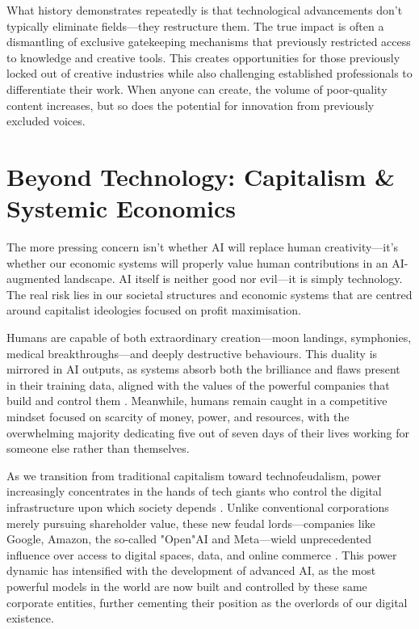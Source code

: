 \documentclass[12pt]{article}
\begin{document}
What history demonstrates repeatedly is that technological advancements don't typically eliminate fields—they restructure them. The true impact is often a dismantling of exclusive gatekeeping mechanisms that previously restricted access to knowledge and creative tools. This creates opportunities for those previously locked out of creative industries while also challenging established professionals to differentiate their work. When anyone can create, the volume of poor-quality content increases, but so does the potential for innovation from previously excluded voices.

\section{Beyond Technology: Capitalism \& Systemic Economics}

The more pressing concern isn't whether AI will replace human creativity—it's whether our economic systems will properly value human contributions in an AI-augmented landscape. AI itself is neither good nor evil—it is simply technology. The real risk lies in our societal structures and economic systems that are centred around capitalist ideologies focused on profit maximisation.

Humans are capable of both extraordinary creation—moon landings, symphonies, medical breakthroughs—and deeply destructive behaviours. This duality is mirrored in AI outputs, as systems absorb both the brilliance and flaws present in their training data, aligned with the values of the powerful companies that build and control them \citep{crawford2021atlas}. Meanwhile, humans remain caught in a competitive mindset focused on scarcity of money, power, and resources, with the overwhelming majority dedicating five out of seven days of their lives working for someone else rather than themselves.

As we transition from traditional capitalism toward technofeudalism, power increasingly concentrates in the hands of tech giants who control the digital infrastructure upon which society depends \citep{varoufakis2021technofeudalism}. Unlike conventional corporations merely pursuing shareholder value, these new feudal lords—companies like Google, Amazon, the so-called "Open"AI and Meta—wield unprecedented influence over access to digital spaces, data, and online commerce \citep{zuboff2019age}. This power dynamic has intensified with the development of advanced AI, as the most powerful models in the world are now built and controlled by these same corporate entities, further cementing their position as the overlords of our digital existence.
\end{document}
